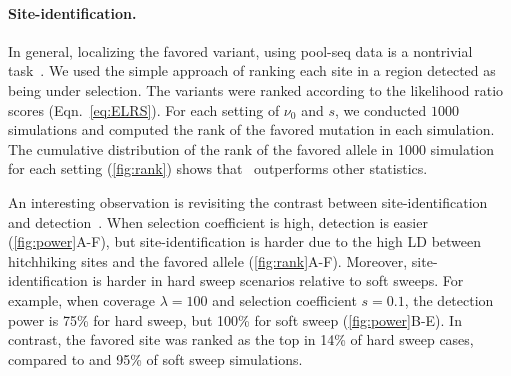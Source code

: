 \paragraph{Site-identification.}
In general, localizing the favored variant, using pool-seq data is a nontrivial 
task~\cite{tobler2014massive}. We used the simple
approach of ranking each site in a region detected as being under
selection. The variants were ranked according to the likelihood ratio
scores (Eqn.~\ref{eq:ELRS}). For each setting of
$\nu_0$ and $s$, we conducted $1000$ simulations and computed the rank
of the favored mutation in each simulation. The cumulative
distribution of the rank of the favored allele in 1000 simulation for
each setting (\ref{fig:rank}) shows that \comale\ outperforms
other statistics.

An interesting observation is revisiting the contrast between 
site-identification
and detection~\cite{long2013massive,tobler2014massive}. 
When selection 
coefficient is high, detection is easier
(\ref{fig:power}A-F), but site-identification is harder due to
the high LD between hitchhiking sites and the favored allele
(\ref{fig:rank}A-F).  Moreover, site-identification is harder in
hard sweep scenarios relative to soft sweeps. For example, when
coverage $\lambda=100$ and selection coefficient $s=0.1$, the
detection power is 75\% for hard sweep, but 100\% for soft sweep
(\ref{fig:power}B-E). In contrast, the favored site was ranked as
the top in 14\% of hard sweep cases, compared to and 95\% of soft
sweep simulations.  
